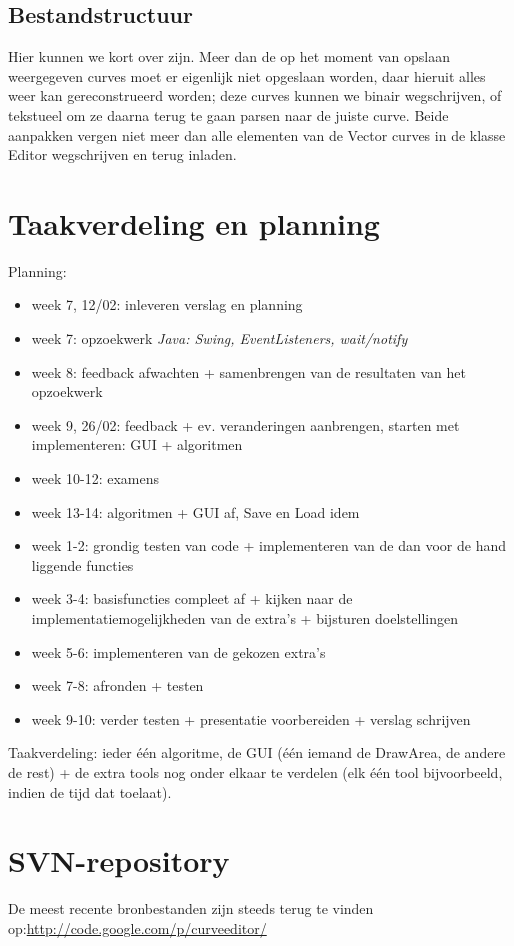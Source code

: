\documentclass[a4paper,11pt,oneside, titlepage]{article}
\begin{document}
\subsection{Bestandstructuur}
Hier kunnen we kort over zijn. Meer dan de op het moment van opslaan weergegeven curves moet er eigenlijk niet opgeslaan worden, daar hieruit alles weer kan gereconstrueerd worden; deze curves kunnen we binair wegschrijven, of tekstueel om ze daarna terug te gaan parsen naar de juiste curve. Beide aanpakken vergen niet meer dan alle elementen van de Vector curves in de klasse Editor wegschrijven en terug inladen.

\section{Taakverdeling en planning}
Planning: 
\begin{itemize}
		\item week 7, 12/02: inleveren verslag en planning
		\item week 7: opzoekwerk \it{Java}\rm{:} Swing, EventListeners, wait/notify
		\item week 8: feedback afwachten + samenbrengen van de resultaten van het opzoekwerk
		\item week 9, 26/02: feedback + ev. veranderingen aanbrengen, starten met implementeren: GUI + algoritmen
		\item week 10-12: examens
		\item week 13-14: algoritmen + GUI af, Save en Load idem
		\item week 1-2: grondig testen van code + implementeren van de dan voor de hand liggende functies
		\item week 3-4: basisfuncties compleet af + kijken naar de implementatiemogelijkheden van de extra's + bijsturen doelstellingen
		\item week 5-6: implementeren van de gekozen extra's
		\item week 7-8: afronden + testen
		\item week 9-10: verder testen + presentatie voorbereiden + verslag schrijven
\end{itemize}
Taakverdeling: ieder \'e\'en algoritme, de GUI (\'e\'en iemand de DrawArea, de andere de rest) + de extra tools nog onder elkaar te verdelen (elk \'e\'en tool bijvoorbeeld, indien de tijd dat toelaat).

\section{SVN-repository}
De meest recente bronbestanden zijn steeds terug te vinden op:\newline \url{http://code.google.com/p/curveeditor/}
\end{document}
